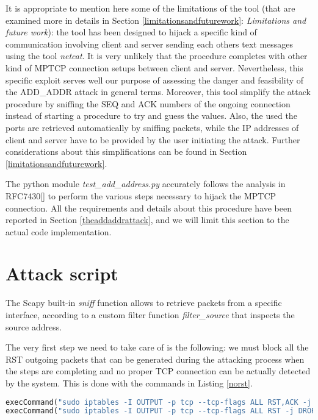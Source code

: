 It is appropriate to mention here some of the limitations of the tool (that are examined more in details in Section \ref{limitationsandfuturework}: \textit{Limitations and future work}): the tool has been designed to hijack a specific kind of communication involving client and server sending each others text messages using the tool \textit{netcat}. It is very unlikely that the procedure completes with other kind of MPTCP connection setups between client and server. Nevertheless, this specific exploit serves well our purpose of assessing the danger and feasibility of the ADD\_ADDR attack in general terms.
Moreover, this tool simplify the attack procedure by sniffing the SEQ and ACK numbers of the ongoing connection instead of starting a procedure to try and guess the values. Also, the used the ports are retrieved automatically by sniffing packets, while the IP addresses of client and server have to be provided by the user initiating the attack. Further considerations about this simplifications can be found in Section \ref{limitationsandfuturework}.

The python module \textit{test\_add\_address.py} accurately follows the analysis in RFC7430[] to perform the various steps necessary to hijack the MPTCP connection. All the requirements and details about this procedure have been reported in Section \ref{theaddaddrattack}, and we will limit this section to the actual code implementation.

\section{Attack script}
The Scapy built-in \textit{sniff} function allows to retrieve packets from a specific interface, according to a custom filter function \textit{filter\_source} that inspects the source address.

The very first step we need to take care of is the following: we must block all the RST outgoing packets that can be generated during the attacking process when the steps are completing and no proper TCP connection can be actually detected by the system. This is done with the commands in Listing \ref{norst}.


\begin{lstlisting}[language=python, caption=\textit{Disable RST outgoing packets}, label=norst]
execCommand("sudo iptables -I OUTPUT -p tcp --tcp-flags ALL RST,ACK -j DROP", shell = True)
execCommand("sudo iptables -I OUTPUT -p tcp --tcp-flags ALL RST -j DROP", shell = True)
\end{lstlisting}

